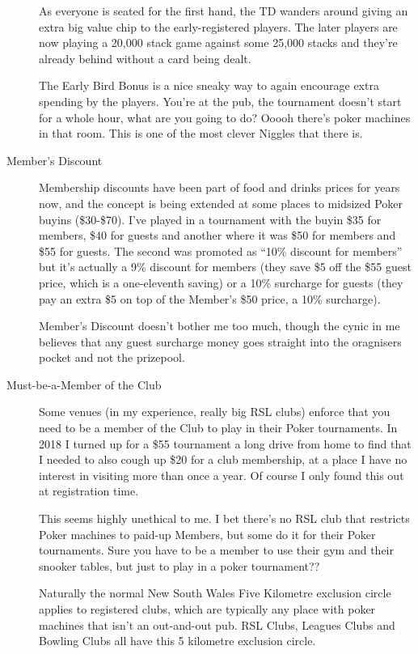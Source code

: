 \begin{description}
As everyone is seated for the first hand, the TD wanders around
giving an extra big value chip to the early-registered players. The
later players are now playing a 20,000 stack game against some
25,000 stacks and they're already behind without a card being dealt.

The Early Bird Bonus is a nice sneaky way to again encourage extra
spending by the players. You're at the pub, the tournament doesn't
start for a whole hour, what are you going to do? Ooooh there's poker
machines in that room. This is one of the most clever Niggles that
there is.

\item[Member's Discount] Membership discounts have been part
of food and drinks prices for years now, and the concept
is being extended at some places to midsized Poker buyins
(\$30-\$70). I've played in a tournament with the buyin
\$35 for members, \$40 for guests and another where it was \$50
for members and \$55 for guests. The second was promoted as ``10\%
discount for members'' but it's actually a 9\% discount for members
(they save \$5 off the \$55 guest price, which is a one-eleventh saving)
or a 10\% surcharge for guests (they pay an extra \$5 on top of the
Member's \$50 price, a 10\% surcharge).

Member's Discount doesn't bother me too much, though the
cynic in me believes that any guest surcharge money
goes straight into the oragnisers pocket and not the prizepool.

\item[Must-be-a-Member of the Club] Some venues (in my experience,
really big RSL clubs) enforce that you need to be a member of the Club
to play in their Poker tournaments. In 2018 I turned up for a \$55
tournament a long drive from home to find that I needed to also cough
up \$20 for a club membership, at a place I have no interest in visiting
more than once a year. Of course I only found this out at registration
time.

This seems highly unethical to me. I bet there's no RSL club that
restricts Poker machines to paid-up Members, but some do it for
their Poker tournaments. Sure you have to be a member to use
their gym and their snooker tables, but just to play
in a poker tournament??

Naturally the normal New South Wales Five Kilometre
exclusion circle applies to registered clubs, which are
typically any place with poker machines that isn't an out-and-out pub.
RSL Clubs, Leagues Clubs and Bowling Clubs all have this 5 kilometre
exclusion circle.


\end{description}
